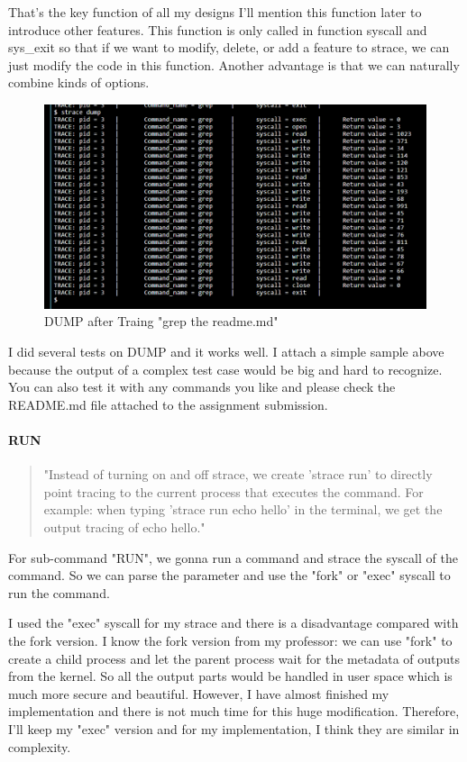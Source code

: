 \documentclass[11pt,oneside,a4paper]{article}
\begin{document}
That's the key function of all my designs I'll mention this function later to introduce 
other features. This function is only called in function syscall and sys\_exit so that
if we want to modify, delete, or add a feature to strace, we can just modify the code 
in this function. Another advantage is that we can naturally combine kinds of options.

\begin{figure}[H]
    \includegraphics[width=4.75in]{1-12.png}
    \centering
    \caption{DUMP after Traing "grep the readme.md"}
\end{figure}

I did several tests on DUMP and it works well. I attach a simple sample above because 
the output of a complex test case would be big and hard to recognize. 
You can also test it with any commands you like and please check the README.md file 
attached to the assignment submission.

\paragraph*{RUN}

\begin{quotation}
    "Instead of turning on and off strace, we create 'strace run' to directly point tracing to the current
process that executes the command. For example: when typing 'strace run echo hello' in the
terminal, we get the output tracing of echo hello."
\end{quotation}

For sub-command "RUN", we gonna run a command and strace the syscall of the command.
So we can parse the parameter and use the "fork" or "exec" syscall to run the command.

I used the "exec" syscall for my strace and there is a disadvantage compared with 
the fork version. I know the fork version from my professor: 
we can use "fork" to create a child process and let the parent process wait for the 
metadata of outputs from the kernel. So all the output parts would be handled in user 
space which is much more secure and beautiful. However, I have almost finished my implementation
and there is not much time for this huge modification. Therefore, I'll keep my "exec"
version and for my implementation, I think they are similar in complexity.
\end{document}
